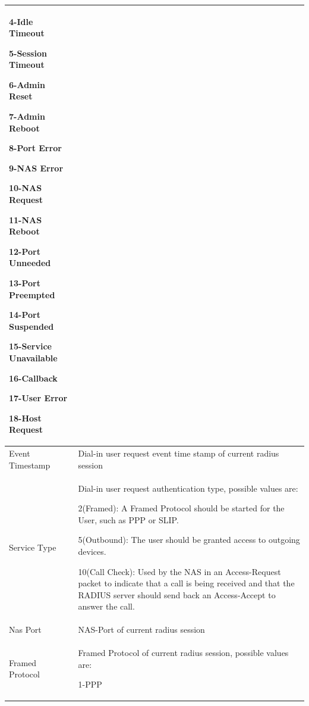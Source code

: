 \begin{longtable}{p{}|p{}}
                                            4-Idle Timeout


                                            5-Session Timeout


                                            6-Admin Reset


                                            7-Admin Reboot


                                            8-Port Error


                                            9-NAS Error


                                            10-NAS Request


                                            11-NAS Reboot


                                            12-Port Unneeded


                                            13-Port Preempted


                                            14-Port Suspended


                                            15-Service Unavailable


                                            16-Callback


                                            17-User Error


                                            18-Host Request \\\hline
    Event Timestamp &	Dial-in user request event time stamp of current radius session \\\hline
    Service Type &	Dial-in user request authentication type, possible values are:


                    2(Framed): A Framed Protocol should be started for the User, such as PPP or SLIP.


                    5(Outbound): The user should be granted access to outgoing devices. 


                    10(Call Check): Used by the NAS in an Access-Request packet to indicate that a call is being received and that the RADIUS server should send back an Access-Accept to answer the call. \\\hline
    Nas Port &	NAS-Port of current radius session \\\hline
    Framed Protocol &	Framed Protocol of current radius session, possible values are:


                        1-PPP



\end{longtable}
